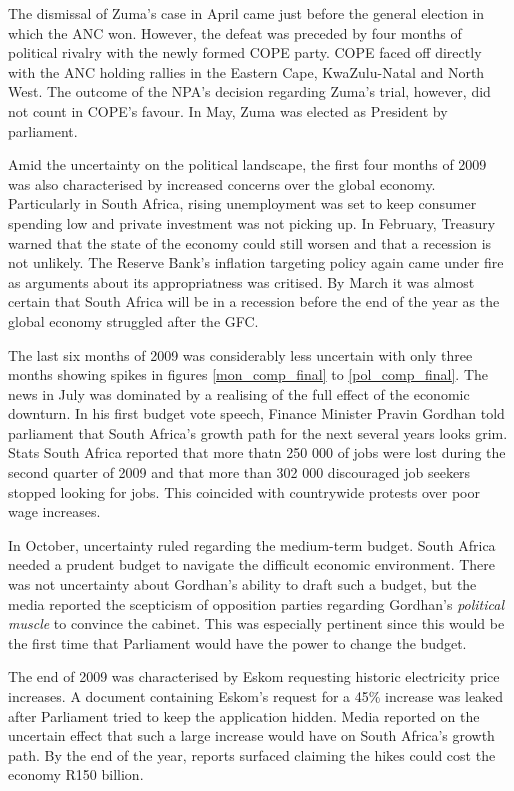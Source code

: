 \documentclass[11pt,preprint, authoryear]{elsarticle}
\numberwithin{equation}{section}
\numberwithin{figure}{section}
\numberwithin{table}{section}
\begin{document}
The dismissal of Zuma's case in April came just before the general
election in which the ANC won. However, the defeat was preceded by four
months of political rivalry with the newly formed COPE party. COPE faced
off directly with the ANC holding rallies in the Eastern Cape,
KwaZulu-Natal and North West. The outcome of the NPA's decision
regarding Zuma's trial, however, did not count in COPE's favour. In May,
Zuma was elected as President by parliament.

Amid the uncertainty on the political landscape, the first four months
of 2009 was also characterised by increased concerns over the global
economy. Particularly in South Africa, rising unemployment was set to
keep consumer spending low and private investment was not picking up. In
February, Treasury warned that the state of the economy could still
worsen and that a recession is not unlikely. The Reserve Bank's
inflation targeting policy again came under fire as arguments about its
appropriatness was critised. By March it was almost certain that South
Africa will be in a recession before the end of the year as the global
economy struggled after the GFC.

The last six months of 2009 was considerably less uncertain with only
three months showing spikes in figures \ref{mon_comp_final} to
\ref{pol_comp_final}. The news in July was dominated by a realising of
the full effect of the economic downturn. In his first budget vote
speech, Finance Minister Pravin Gordhan told parliament that South
Africa's growth path for the next several years looks grim. Stats South
Africa reported that more thatn 250 000 of jobs were lost during the
second quarter of 2009 and that more than 302 000 discouraged job
seekers stopped looking for jobs. This coincided with countrywide
protests over poor wage increases.

In October, uncertainty ruled regarding the medium-term budget. South
Africa needed a prudent budget to navigate the difficult economic
environment. There was not uncertainty about Gordhan's ability to draft
such a budget, but the media reported the scepticism of opposition
parties regarding Gordhan's \emph{political muscle} to convince the
cabinet. This was especially pertinent since this would be the first
time that Parliament would have the power to change the budget.

The end of 2009 was characterised by Eskom requesting historic
electricity price increases. A document containing Eskom's request for a
45\% increase was leaked after Parliament tried to keep the application
hidden. Media reported on the uncertain effect that such a large
increase would have on South Africa's growth path. By the end of the
year, reports surfaced claiming the hikes could cost the economy R150
billion.
\end{document}
